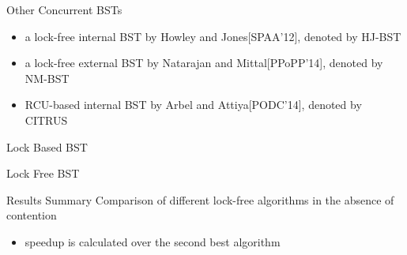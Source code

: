 \begin{frame}{Other Concurrent BSTs}
\begin{itemize}
\item a lock-free internal BST by Howley and Jones[SPAA'12], denoted by HJ-BST
\item a lock-free external BST by Natarajan and Mittal[PPoPP'14], denoted by NM-BST
\item RCU-based internal BST by Arbel and Attiya[PODC'14], denoted by CITRUS 
\end{itemize}
\end{frame}

\begin{frame}{Lock Based BST}

\end{frame}

\begin{frame}{Lock Free BST}

\end{frame}

\begin{frame}{Results Summary}
Comparison of different lock-free algorithms in the absence of contention

\pause
\begin{itemize}
\item speedup is calculated over the second best algorithm
\end{itemize}

\end{frame}
